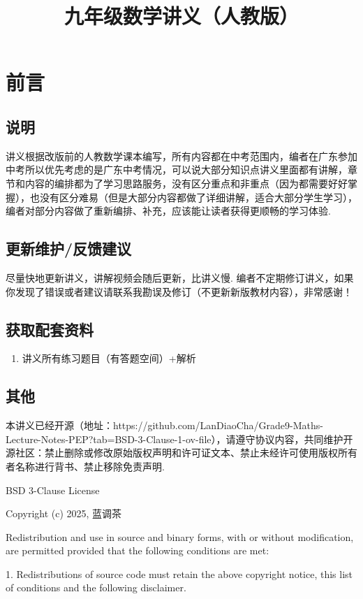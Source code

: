 \documentclass[lang=cn, 10pt, titlestyle=display, oneside]{elegantbook}
\title{九年级数学讲义（人教版）}
\begin{document}
\chapter*{前言}

\section*{说明}

讲义根据改版前的人教数学课本编写，所有内容都在中考范围内，编者在广东参加中考所以优先考虑的是广东中考情况，可以说大部分知识点讲义里面都有讲解，章节和内容的编排都为了学习思路服务，没有区分重点和非重点（因为都需要好好掌握），也没有区分难易（但是大部分内容都做了详细讲解，适合大部分学生学习），编者对部分内容做了重新编排、补充，应该能让读者获得更顺畅的学习体验.

\section*{更新维护/反馈建议}

尽量快地更新讲义，讲解视频会随后更新，比讲义慢. 编者不定期修订讲义，如果你发现了错误或者建议请联系我勘误及修订（不更新新版教材内容），非常感谢！


\section*{获取配套资料}

\begin{enumerate}
    \item 讲义所有练习题目（有答题空间）+解析
\end{enumerate}


\section*{其他}

本讲义已经开源（地址：https://github.com/LanDiaoCha/Grade9-Maths-Lecture-Notes-PEP?tab=BSD-3-Clause-1-ov-file），请遵守协议内容，共同维护开源社区：禁止删除或修改原始版权声明和许可证文本、禁止未经许可使用版权所有者名称进行背书、禁止移除免责声明.
\par
BSD 3-Clause License

Copyright (c) 2025, 蓝调茶

Redistribution and use in source and binary forms, with or without
modification, are permitted provided that the following conditions are met:

1. Redistributions of source code must retain the above copyright notice, this
   list of conditions and the following disclaimer.
\end{document}
